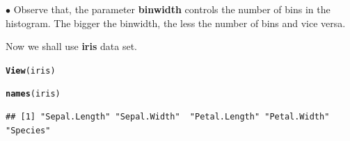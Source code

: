 \documentclass[11pt, a4paper]{article}\usepackage[]{graphicx}\usepackage[]{xcolor}
\makeatletter
\newcommand{\hlstd}[1]{\textcolor[rgb]{0.345,0.345,0.345}{#1}}%
\newcommand{\hlkwd}[1]{\textcolor[rgb]{0.737,0.353,0.396}{\textbf{#1}}}%
\newenvironment{kframe}{%
 \def\at@end@of@kframe{}%
 \ifinner\ifhmode%
  \def\at@end@of@kframe{\end{minipage}}%
  \begin{minipage}{\columnwidth}%
 \fi\fi%
 \def\FrameCommand##1{\hskip\@totalleftmargin \hskip-\fboxsep
 \colorbox{shadecolor}{##1}\hskip-\fboxsep
     \hskip-\linewidth \hskip-\@totalleftmargin \hskip\columnwidth}%
 \MakeFramed {\advance\hsize-\width
   \@totalleftmargin\z@ \linewidth\hsize
   \@setminipage}}%
 {\par\unskip\endMakeFramed%
 \at@end@of@kframe}
\newenvironment{knitrout}{}{} %
\makeatother
\begin{document}
$\bullet$ Observe that, the parameter \textbf{binwidth} controls the number of bins in the histogram. The bigger the binwidth, the less the number of bins and vice versa.

Now we shall use \textbf{iris} data set.

\begin{knitrout}
\color{fgcolor}\begin{kframe}
\begin{alltt}
\hlkwd{View}\hlstd{(iris)}
\end{alltt}
\end{kframe}
\end{knitrout}

\begin{knitrout}
\color{fgcolor}\begin{kframe}
\begin{alltt}
\hlkwd{names}\hlstd{(iris)}
\end{alltt}
\begin{verbatim}
## [1] "Sepal.Length" "Sepal.Width"  "Petal.Length" "Petal.Width"  "Species"
\end{verbatim}
\end{kframe}
\end{knitrout}

\newpage
\end{document}
